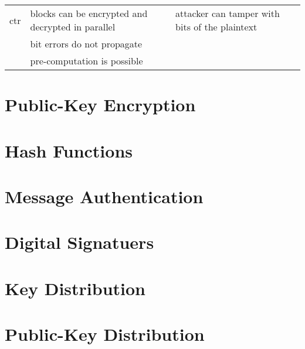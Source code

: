\documentclass[draft]{article}
\begin{document}
\begin{center}
\begin{tabular}{lp{}p{}}
        \acrshort{ctr}                  & blocks can be encrypted and decrypted in parallel    & attacker can tamper with bits of the plaintext                       \\\cmidrule{2-3}
                                        & bit errors do not propagate                          &                                                                      \\\cmidrule{2-2}
                                        & pre-computation is possible                          &                                                                      \\\bottomrule
    \end{tabular}
\end{center}
\section{Public-Key Encryption}
\section{Hash Functions}
\section{Message Authentication}
\section{Digital Signatuers}
\section{Key Distribution}
\section{Public-Key Distribution}
\clearpage

\glsaddall
\printglossary[nonumberlist]
\printglossary[nonumberlist,type=\acronymtype]
\end{document}
